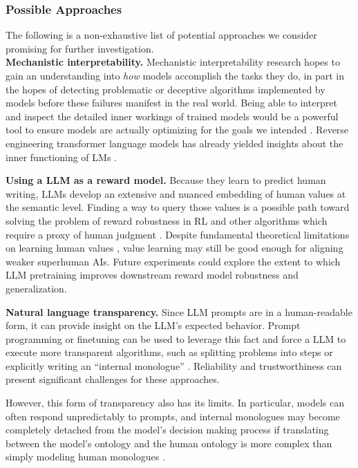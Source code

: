 \documentclass{article}
\begin{document}
\subsubsection{Possible Approaches}

The following is a non-exhaustive list of potential approaches we consider promising for further investigation.\\

\textbf{Mechanistic interpretability.} Mechanistic interpretability research \citep{circuits} hopes to gain an understanding into \textit{how} models accomplish the tasks they do, in part in the hopes of detecting problematic or deceptive algorithms implemented by models before these failures manifest in the real world. Being able to interpret and inspect the detailed inner workings of trained models would be a powerful tool to ensure models are actually optimizing for the goals we intended \citep{hubinger2021rlo,koch2021objective}. Reverse engineering transformer language models has already yielded insights about the inner functioning of LMs \citep{anthropic-transformer-circuits,logit-lens, anonymous2022ROME, knowledge-neuron}. 

\textbf{Using a LLM as a reward model.} Because they learn to predict human writing, LLMs develop an extensive and nuanced embedding of human values at the semantic level. Finding a way to query those values is a possible path toward solving the problem of reward robustness in RL and other algorithms which require a proxy of human judgment \citep{rlhf-summ, alignment-by-default}. Despite fundamental theoretical limitations on learning human values \citep{Armstrong2018OccamsRI}, value learning may still be good enough for aligning weaker superhuman AIs. Future experiments could explore the extent to which LLM pretraining improves downstream reward model robustness and generalization.

\textbf{Natural language transparency.} Since LLM prompts are in a human-readable form, it can provide insight on the LLM’s expected behavior. Prompt programming or finetuning can be used to leverage this fact and force a LLM to execute more transparent algorithms, such as splitting problems into steps or explicitly writing an “internal monologue” \citep{visible-thoughts, factored-cognition}. Reliability and trustworthiness can present significant challenges for these approaches. 

However, this form of transparency also has its limits. In particular, models can often respond unpredictably to prompts, and internal monologues may become completely detached from the model's decision making process if translating between the model's ontology and the human ontology is more complex than simply modeling human monologues \citep{elk}.
\end{document}
